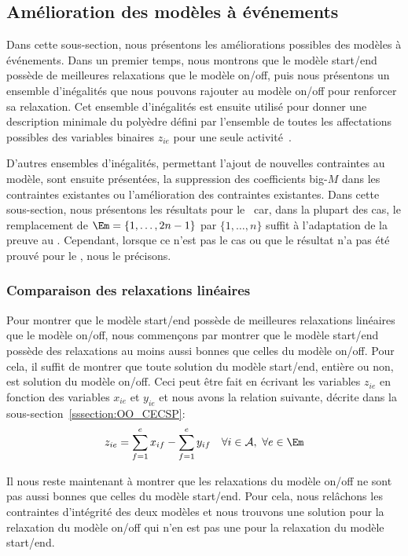 \subsection{Amélioration des modèles à événements}
\label{sec:amelioration_OO}
Dans cette sous-section, nous présentons les améliorations possibles des
modèles à événements. Dans un premier temps, nous montrons que le
modèle start/end possède de meilleures relaxations que le modèle
on/off, puis nous présentons un ensemble d'inégalités que nous pouvons
rajouter au modèle on/off pour renforcer sa relaxation. Cet ensemble
d'inégalités est ensuite utilisé pour donner une description minimale
du polyèdre défini par l'ensemble de toutes les affectations possibles
des variables binaires $z_{ie}$ pour une seule
activité~\cite{LAASreport}.  

D'autres ensembles d'inégalités, permettant l'ajout de nouvelles
contraintes au modèle, sont ensuite présentées, la suppression des
coefficients big-$M$ dans les contraintes existantes ou l'amélioration
des contraintes existantes. Dans cette sous-section, nous présentons les
résultats pour le \CECSP~car, dans la plupart des cas, le remplacement
de $\Em=\{1,\dots,2n-1\}$ par $\{1,\dots,n\}$ suffit à l'adaptation de
la preuve au \RCPSP. Cependant, lorsque ce n'est pas le cas ou que le
résultat n'a pas été prouvé pour le \RCPSP, nous le précisons.

\subsubsection{Comparaison des relaxations linéaires}

Pour montrer que le modèle start/end possède de meilleures relaxations
linéaires que le modèle on/off, nous commençons par montrer que le
modèle start/end possède des relaxations au moins aussi bonnes que
celles du modèle on/off. Pour cela, il suffit de  montrer que toute solution du 
modèle start/end, entière ou non, est solution du modèle on/off. Ceci
peut être fait en écrivant les variables $z_{ie}$ en fonction des
variables $x_{ie}$ et $y_{ie}$ et nous avons la relation suivante,
décrite dans la sous-section~\ref{sssection:OO_CECSP}: 
\begin{equation}
\label{SEversOO}
z_{ie} = \sum_{f=1}^e x_{if} -  \sum_{f=1}^e y_{if} \quad \forall i
\in \A,\ \forall e\in \Em
\end{equation}

Il nous reste maintenant à montrer que les relaxations du modèle
on/off ne sont pas aussi bonnes que celles du modèle start/end. Pour
cela, nous relâchons les contraintes d'intégrité des deux modèles et
nous trouvons une solution pour la relaxation du modèle on/off qui
n'en est pas une pour la relaxation du modèle start/end. 

